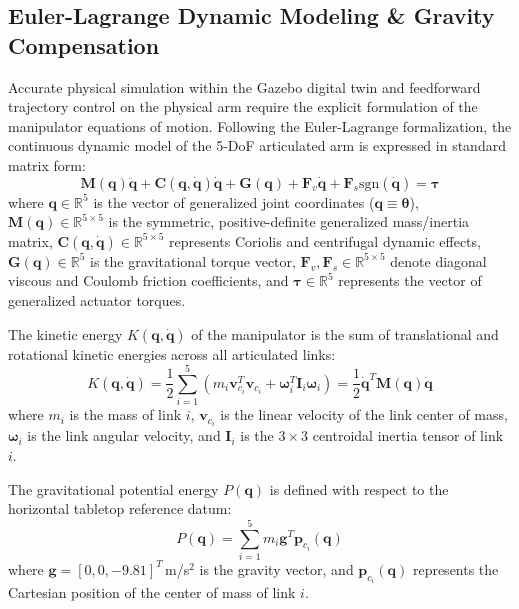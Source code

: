 \documentclass[journal]{IEEEtran}
\begin{document}
\subsection{Euler-Lagrange Dynamic Modeling \& Gravity Compensation}
Accurate physical simulation within the Gazebo digital twin and feedforward trajectory control on the physical arm require the explicit formulation of the manipulator equations of motion. Following the Euler-Lagrange formalization, the continuous dynamic model of the 5-DoF articulated arm is expressed in standard matrix form:
\begin{equation}
\mathbf{M}(\mathbf{q})\ddot{\mathbf{q}} + \mathbf{C}(\mathbf{q}, \dot{\mathbf{q}})\dot{\mathbf{q}} + \mathbf{G}(\mathbf{q}) + \mathbf{F}_v \dot{\mathbf{q}} + \mathbf{F}_s \text{sgn}(\dot{\mathbf{q}}) = \boldsymbol{\tau}
\end{equation}
where $\mathbf{q} \in \mathbb{R}^5$ is the vector of generalized joint coordinates ($\mathbf{q} \equiv \boldsymbol{\theta}$), $\mathbf{M}(\mathbf{q}) \in \mathbb{R}^{5\times5}$ is the symmetric, positive-definite generalized mass/inertia matrix, $\mathbf{C}(\mathbf{q}, \dot{\mathbf{q}}) \in \mathbb{R}^{5\times5}$ represents Coriolis and centrifugal dynamic effects, $\mathbf{G}(\mathbf{q}) \in \mathbb{R}^5$ is the gravitational torque vector, $\mathbf{F}_v, \mathbf{F}_s \in \mathbb{R}^{5\times5}$ denote diagonal viscous and Coulomb friction coefficients, and $\boldsymbol{\tau} \in \mathbb{R}^5$ represents the vector of generalized actuator torques.

The kinetic energy $K(\mathbf{q}, \dot{\mathbf{q}})$ of the manipulator is the sum of translational and rotational kinetic energies across all articulated links:
\begin{equation}
K(\mathbf{q}, \dot{\mathbf{q}}) = \frac{1}{2} \sum_{i=1}^5 \left( m_i \mathbf{v}_{c_i}^T \mathbf{v}_{c_i} + \boldsymbol{\omega}_i^T \mathbf{I}_i \boldsymbol{\omega}_i \right) = \frac{1}{2} \dot{\mathbf{q}}^T \mathbf{M}(\mathbf{q}) \dot{\mathbf{q}}
\end{equation}
where $m_i$ is the mass of link $i$, $\mathbf{v}_{c_i}$ is the linear velocity of the link center of mass, $\boldsymbol{\omega}_i$ is the link angular velocity, and $\mathbf{I}_i$ is the $3\times3$ centroidal inertia tensor of link $i$.

The gravitational potential energy $P(\mathbf{q})$ is defined with respect to the horizontal tabletop reference datum:
\begin{equation}
P(\mathbf{q}) = \sum_{i=1}^5 m_i \mathbf{g}^T \mathbf{p}_{c_i}(\mathbf{q})
\end{equation}
where $\mathbf{g} = [0, 0, -9.81]^T$\,m/s$^2$ is the gravity vector, and $\mathbf{p}_{c_i}(\mathbf{q})$ represents the Cartesian position of the center of mass of link $i$.
\end{document}
